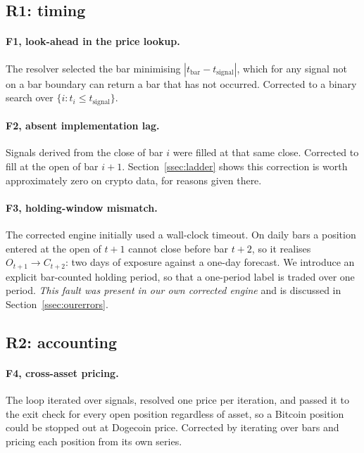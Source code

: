 \documentclass[preprint,12pt,authoryear]{elsarticle}
\begin{document}
\subsection{R1: timing}

\paragraph{F1, look-ahead in the price lookup.} The resolver selected the bar
minimising $|t_{\text{bar}} - t_{\text{signal}}|$, which for any signal not on a
bar boundary can return a bar that has not occurred. Corrected to a binary
search over $\{i : t_i \le t_{\text{signal}}\}$.

\paragraph{F2, absent implementation lag.} Signals derived from the close of bar
$i$ were filled at that same close. Corrected to fill at the open of bar $i+1$.
Section~\ref{ssec:ladder} shows this correction is worth approximately zero on
crypto data, for reasons given there.

\paragraph{F3, holding-window mismatch.} The corrected engine initially used a
wall-clock timeout. On daily bars a position entered at the open of $t+1$ cannot
close before bar $t+2$, so it realises $O_{t+1} \to C_{t+2}$: two days of
exposure against a one-day forecast. We introduce an explicit bar-counted
holding period, so that a one-period label is traded over one period.
\emph{This fault was present in our own corrected engine} and is discussed in
Section~\ref{ssec:ourerrors}.

\subsection{R2: accounting}

\paragraph{F4, cross-asset pricing.} The loop iterated over signals, resolved one
price per iteration, and passed it to the exit check for every open position
regardless of asset, so a Bitcoin position could be stopped out at Dogecoin
price. Corrected by iterating over bars and pricing each position from its own
series.
\end{document}
